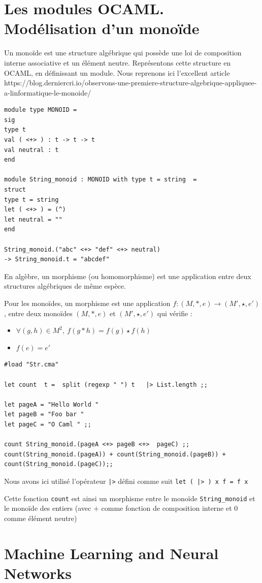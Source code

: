 \documentclass[11pt]{book}
\begin{document}
\section{Les modules OCAML. Modélisation d'un monoïde}
Un monoïde est une structure algébrique qui possède une loi de composition
interne associative et un élément neutre.
Représentons cette structure en OCAML, en définissant un module.
Nous reprenons ici l'excellent article 
https://blog.derniercri.io/observons-une-premiere-structure-algebrique-appliquee-a-linformatique-le-monoide/
\begin{Verbatim}
module type MONOID =
sig
type t
val ( <+> ) : t -> t -> t
val neutral : t	
end

module String_monoid : MONOID with type t = string  =
struct
type t = string
let ( <+> ) = (^)
let neutral = ""
end

String_monoid.("abc" <+> "def" <+> neutral)
-> String_monoid.t = "abcdef"	
\end{Verbatim}

En algèbre, un morphisme (ou homomorphisme) est une application entre deux structures algébriques
de même espèce.

Pour les  monoïdes, un morphisme est une application 
$f:(M,*,e)\longrightarrow (M',\star ,e')$ , entre deux monoïdes $ (M,*,e)$ et 
$(M',\star , e')$ qui vérifie :
\begin{itemize}
	\item $\forall (g,h)\in M^{2},~f(g*h)=f(g)\star f(h)$
	\item $f(e)=e'$
\end{itemize}
\begin{Verbatim}
#load "Str.cma"

let count  t =  split (regexp " ") t   |> List.length ;;

let pageA = "Hello World "
let pageB = "Foo bar "
let pageC = "O Caml " ;;

count String_monoid.(pageA <+> pageB <+>  pageC) ;;
count(String_monoid.(pageA)) + count(String_monoid.(pageB)) + count(String_monoid.(pageC));;
\end{Verbatim}
Nous avons ici utilisé l'opérateur \verb+|>+ défini comme suit \verb+let ( |> ) x f = f x+

Cette fonction \verb+count+ est ainsi un morphisme entre le monoïde \verb+String_monoid+ et 
le monoïde des entiers (avec $+$ comme fonction de composition interne et $0$
comme élément neutre)
\section{Machine Learning and Neural Networks}
\end{document}
